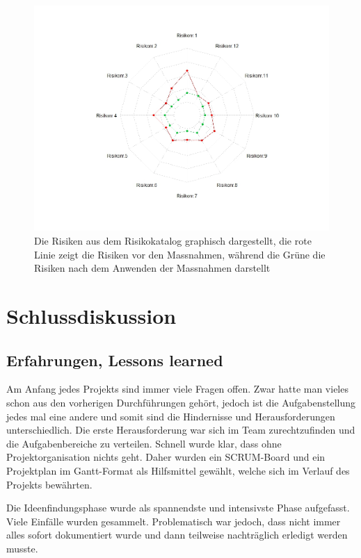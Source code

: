 \documentclass[a4paper]{report}
\begin{document}
\begin{figure}[h!]
	\centering
	\includegraphics[width=\textwidth,keepaspectratio]{Risikomatrix_Spinne}
	\caption{Die Risiken aus dem Risikokatalog graphisch dargestellt, die rote Linie zeigt die Risiken vor den Massnahmen, während die Grüne die Risiken nach dem Anwenden der Massnahmen darstellt}
	\label{fig:Risikomatrix_Spinne}
\end{figure}

\chapter{Schlussdiskussion}
\label{ch:SchlussDisku}

\section{Erfahrungen, Lessons learned}
\label{sec:EXP}
Am Anfang jedes Projekts sind immer viele Fragen offen. Zwar hatte man vieles schon aus den vorherigen Durchführungen gehört, jedoch ist die Aufgabenstellung jedes mal eine andere und somit sind die Hindernisse und Herausforderungen unterschiedlich. Die erste Herausforderung war sich im Team zurechtzufinden und die Aufgabenbereiche zu verteilen. Schnell wurde klar, dass ohne Projektorganisation nichts geht. Daher wurden ein SCRUM-Board und ein Projektplan im Gantt-Format als Hilfsmittel gewählt, welche sich im Verlauf des Projekts bewährten.

Die Ideenfindungsphase wurde als spannendste und intensivste Phase aufgefasst. Viele Einfälle wurden gesammelt. Problematisch war jedoch, dass nicht immer alles sofort dokumentiert wurde und dann teilweise nachträglich erledigt werden musste.
\end{document}
